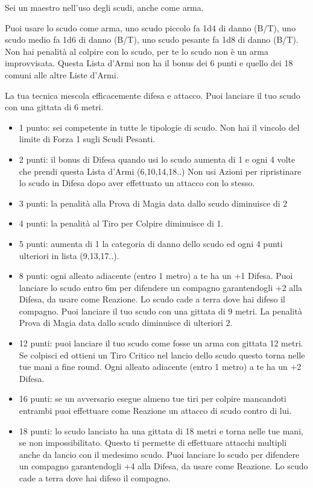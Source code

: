 \begin{multicols}{2}
Sei un maestro nell'uso degli scudi, anche come arma.

Puoi usare lo scudo come arma, uno scudo piccolo fa 1d4 di danno (B/T), uno scudo medio fa 1d6 di danno (B/T), uno scudo pesante fa 1d8 di danno (B/T).
Non hai penalità al colpire con lo scudo, per te lo scudo non è un arma improvvisata. Questa Lista d'Armi non ha il bonus dei 6 punti e quello dei 18 comuni alle altre Liste d'Armi.

La tua tecnica mescola efficacemente difesa e attacco. Puoi lanciare il tuo scudo con una gittata di 6 metri.

\begin{itemize}[leftmargin=*] \setlength{\itemsep}{0pt}
\item 1 punto: sei competente in tutte le tipologie di scudo. Non hai il vincolo del limite di Forza 1 sugli Scudi Pesanti.
\item 2 punti: il bonus di Difesa quando usi lo scudo aumenta di 1 e ogni 4 volte che prendi questa Lista d'Armi (6,10,14,18..) Non usi Azioni per ripristinare lo scudo in Difesa dopo aver effettuato un attacco con lo stesso.
\item 3 punti: la penalità alla Prova di Magia data dallo scudo diminuisce di 2
\item 4 punti: la penalità al Tiro per Colpire diminuisce di 1.
\item 5 punti: aumenta di 1 la categoria di danno dello scudo ed ogni 4 punti ulteriori in lista (9,13,17..).
\item 8 punti: ogni alleato adiacente (entro 1 metro) a te ha un +1 Difesa. Puoi lanciare lo scudo entro 6m per difendere un compagno garantendogli +2 alla Difesa, da usare come Reazione. Lo scudo cade a terra dove hai difeso il compagno. Puoi lanciare il tuo scudo con una gittata di 9 metri. La penalità Prova di Magia data dallo scudo diminuisce di ulteriori 2.
\item 12 punti: puoi lanciare il tuo scudo come fosse un arma con gittata 12 metri. Se colpisci ed ottieni un Tiro Critico nel lancio dello scudo questo torna nelle tue mani a fine round. Ogni alleato adiacente (entro 1 metro) a te ha un +2 Difesa.
\item 16 punti: se un avversario esegue almeno tue tiri per colpire mancandoti entrambi puoi effettuare come Reazione un attacco di scudo contro di lui.
\item 18 punti: lo scudo lanciato ha una gittata di 18 metri e torna nelle tue mani, se non impossibilitato. Questo ti permette di effettuare attacchi multipli anche da lancio con il medesimo scudo. Puoi lanciare lo scudo per difendere un compagno garantendogli +4 alla Difesa, da usare come Reazione. Lo scudo cade a terra dove hai difeso il compagno.


\end{itemize}
\end{multicols}
